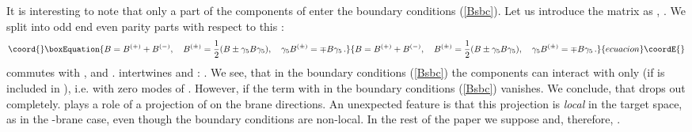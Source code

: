 \documentclass[a4paper,12pt,twoside]{article}
\begin{document}
It is interesting to note that only a part of the components
of \coordHE{} enter the boundary conditions (\ref{Bsbc}). Let us introduce
the \coordHE{} matrix as \coordHE{},
\coordHE{}. We split \coordHE{} into odd end even parity parts
with respect to this \coordHE{}:
\begin{equation}\coord{}\boxEquation{
B=B^{(+)}+B^{(-)},\quad B^{(\pm)}=\frac 12 (B\pm\gamma_5 B\gamma_5),
\quad \gamma_5 B^{(\pm)}=\mp B\gamma_5 \,.\label{oddeven}
}{
B=B^{(+)}+B^{(-)},\quad B^{(\pm)}=\frac 12 (B\pm\gamma_5 B\gamma_5),
\quad \gamma_5 B^{(\pm)}=\mp B\gamma_5 \,.}{ecuacion}\coordE{}\end{equation} 
\coordHE{} commutes with \myHighlight{$\Pi_-$}\coordHE{}, \myHighlight{$\Pi_+$}\coordHE{} and \coordHE{}.
\coordHE{} intertwines \myHighlight{$\Pi_+$}\coordHE{} and \myHighlight{$\Pi_-$}\coordHE{}: \coordHE{}.
We see, that in the boundary conditions (\ref{Bsbc}) the
components \coordHE{} can interact with \coordHE{} only (if \coordHE{} is
included in \coordHE{}), i.e. with zero modes of \myHighlight{$\partial_\tau$}\coordHE{}.
However, if \coordHE{} the term with \coordHE{}
in the boundary conditions (\ref{Bsbc}) vanishes. We conclude,
that \coordHE{} drops out completely. \coordHE{} plays a role
of a projection of \coordHE{} on the brane directions. An unexpected feature is
that this projection is {\it local} in the target space, as
in the \coordHE{}-brane case, even though the boundary conditions
are non-local. In the rest of the paper we suppose \coordHE{}
and, therefore, \coordHE{}.
\end{document}
